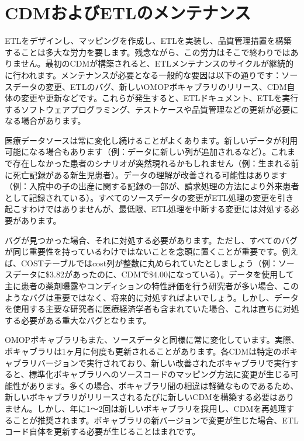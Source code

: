 \documentclass[
  11pt]{book}
\theoremstyle{definition}
\theoremstyle{definition}
\theoremstyle{definition}
\theoremstyle{definition}
\theoremstyle{remark}
\begin{document}
\section{CDMおよびETLのメンテナンス}\label{CDMandETLMaintenance}

ETLをデザインし、マッピングを作成し、ETLを実装し、品質管理措置を構築することは多大な労力を要します。残念ながら、この労力はそこで終わりではありません。最初のCDMが構築されると、ETLメンテナンスのサイクルが継続的に行われます。メンテナンスが必要となる一般的な要因は以下の通りです：ソースデータの変更、ETLのバグ、新しいOMOPボキャブラリのリリース、CDM自体の変更や更新などです。これらが発生すると、ETLドキュメント、ETLを実行するソフトウェアプログラミング、テストケースや品質管理などの更新が必要になる場合があります。

医療データソースは常に変化し続けることがよくあります。新しいデータが利用可能になる場合もあります（例：データに新しい列が追加されるなど）。これまで存在しなかった患者のシナリオが突然現れるかもしれません（例：生まれる前に死亡記録がある新生児患者）。データの理解が改善される可能性はあります（例：入院中の子の出産に関する記録の一部が、請求処理の方法により外来患者として記録されている）。すべてのソースデータの変更がETL処理の変更を引き起こすわけではありませんが、最低限、ETL処理を中断する変更には対処する必要があります。

バグが見つかった場合、それに対処する必要があります。ただし、すべてのバグが同じ重要性を持っているわけではないことを念頭に置くことが重要です。例えば、COSTテーブルではcost列が整数に丸められていたとしましょう（例：ソースデータに\$3.82があったのに、CDMで\$4.00になっている）。データを使用して主に患者の薬剤曝露やコンディションの特性評価を行う研究者が多い場合、このようなバグは重要ではなく、将来的に対処すればよいでしょう。しかし、データを使用する主要な研究者に医療経済学者も含まれていた場合、これは直ちに対処する必要がある重大なバグとなります。

OMOPボキャブラリもまた、ソースデータと同様に常に変化しています。実際、ボキャブラリは1ヶ月に何度も更新されることがあります。各CDMは特定のボキャブラリバージョンで実行されており、新しい改善されたボキャブラリで実行すると、標準化ボキャブラリへのソースコードのマッピング方法に変更が生じる可能性があります。多くの場合、ボキャブラリ間の相違は軽微なものであるため、新しいボキャブラリがリリースされるたびに新しいCDMを構築する必要はありません。しかし、年に1～2回は新しいボキャブラリを採用し、CDMを再処理することが推奨されます。ボキャブラリの新バージョンで変更が生じた場合、ETLコード自体を更新する必要が生じることはまれです。
\end{document}
